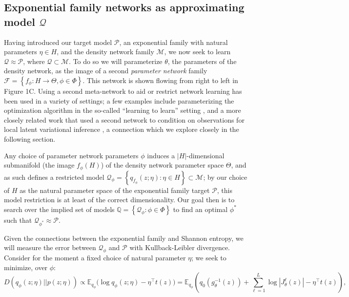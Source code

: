 \documentclass{article}
\begin{document}
 \subsection{Exponential family networks as approximating model $\mathcal{Q}$}

Having introduced our target model $\mathcal{P}$, an exponential family with natural parameters $\eta \in H$, and the density network family $\mathcal{M}$, we now seek to learn $\mathcal{Q} \approx \mathcal{P}$, where $\mathcal{Q} \subset \mathcal{M}$.  
To do so we will parameterize $\theta$, the parameters of the density network, as the image of a second \emph{parameter network} family $\mathcal{F} = \left\{ f_\phi : H \rightarrow \Theta, \phi \in \Phi\right\}$.   
This network is shown flowing from right to left in Figure 1C.  
Using a second meta-network to aid or restrict network learning has been used in a variety of settings; a few examples include parameterizing the optimization algorithm in the so-called ``learning to learn'' setting \cite{andrychowicz2016learning}, and a more closely related work that used a second network to condition on observations for local latent variational inference \cite{rezende2015variational}, a connection which we explore closely in the following section.

Any choice of parameter network parameters $\phi$ induces a $|H|$-dimensional submanifold (the image $f_\phi(H)$) of the density network parameter space $\Theta$, and as such defines a restricted model $\mathcal{Q}_\phi = \left\{ q_{f_{\phi}}(z; \eta): \eta \in H\right\} \subset \mathcal{M}$; by our choice of $H$ as the natural parameter space of the exponential family target $\mathcal{P}$, this model restriction is at least of the correct dimensionality.
Our goal then is to search over the implied set of models $\mathbb{Q} = \left\{ \mathcal{Q}_\phi : \phi \in \Phi \right\}$ to find an optimal $\phi^*$ such that $\mathcal{Q}_{\phi^*} \approx \mathcal{P}$. 

Given the connections between the exponential family and Shannon entropy, we will measure the error between $\mathcal{Q}_{\phi}$ and $\mathcal{P}$ with Kullback-Leibler divergence.  Consider for the moment a fixed choice of natural parameter $\eta$; we seek to minimize, over $\phi$:
%
{\small $$ D\left( q_\phi(z;\eta) || p(z;\eta) \right) \propto \mathbb{E}_{q_\phi} \Bigg( \log q_\phi(z;\eta) - \eta^\top t(z) \Bigg) = \mathbb{E}_{q_\phi} \left( q_0\left( g_\theta^{-1}(z)\right) + \sum_{\ell=1}^L  \log | J^\ell_\theta(z) | - \eta^\top t(z) \right),$$}
%
\end{document}
